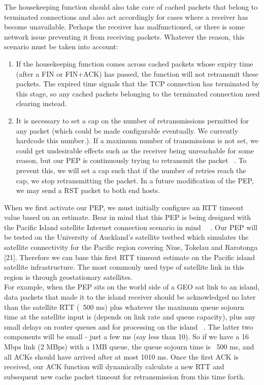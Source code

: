 \noindent The housekeeping function should also take care of cached packets that belong to terminated connections and also act accordingly for cases where a receiver has become unavailable. Perhaps the receiver has malfunctioned, or there is some network issue preventing it from receiving packets. Whatever the reason, this scenario must be taken into account:  \\ 

\begin{enumerate}
\item If the housekeeping function comes across cached packets whose expiry time (after a FIN or FIN+ACK) has passed, the function will not retransmit these packets. The expired time signals that the TCP connection has terminated by this stage, so any cached packets belonging to the terminated connection need clearing instead.\\
\item It is necessary to set a cap on the number of retransmissions permitted for any packet (which could be made configurable eventually. We currently hardcode this number.). If a maximum number of transmissions is not set, we could get undesirable effects such as the receiver being unreachable for some reason, but our PEP is continuously trying to retransmit the packet ~\cite{6}. To prevent this, we will set a cap such that if the number of retries reach the cap, we stop retransmitting the packet. In a future modification of the PEP, we may send a RST packet to both end hosts.\\
\end{enumerate}

When we first activate our PEP, we must initially configure an RTT timeout value based on an estimate. Bear in mind that this PEP is being designed with the Pacific Island satellite Internet connection scenario in mind ~\cite{3}~\cite{4}. Our PEP will be tested on the University of Auckland's satellite testbed which simulates the satellite connectivity for the Pacific region covering Niue, Tokelau and Rarotonga [21]. Therefore we can base this first RTT timeout estimate on the Pacific island satellite infrastructure. The most commonly used type of satellite link in this region is through geostationary satellites.\\

For example, when the PEP sits on the world side of a GEO sat link to an island, data packets that made it to the island receiver should be acknowledged no later than the satellite RTT (~500 ms) plus whatever the maximum queue sojourn time at the satellite input is (depends on link rate and queue capacity), plus any small delays on router queues and for processing on the island ~\cite{4}. The latter two components will be small - just a few ms (say less than 10). So if we have a 16 Mbps link (2 MBps) with a 1MB queue, the queue sojourn time is ~500 ms, and all ACKs should have arrived after at most 1010 ms. Once the first ACK is received, our ACK function will dynamically calculate a new RTT and subsequent new cache packet timeout for retransmission from this time forth.\\

